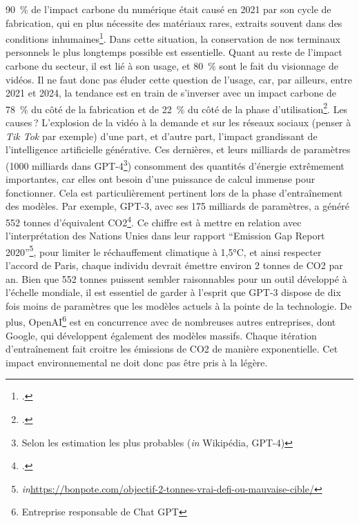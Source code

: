 90 \% de l’impact carbone du numérique était causé en 2021 par son cycle de fabrication, qui en plus nécessite des matériaux rares, extraits souvent dans des conditions inhumaines\footcite[§ 16]{guillard_chapitre_2021}. Dans cette situation, la conservation de nos terminaux personnels le plus longtemps possible est essentielle. Quant au reste de l’impact carbone du secteur, il est lié à son usage, et 80 \% sont le fait du visionnage de vidéos. Il ne faut donc pas éluder cette question de l’usage, car, par ailleurs, entre 2021 et 2024, la tendance est en train de s’inverser avec un impact carbone de 78 \% du côté de la fabrication et de 22 \% du côté de la phase d’utilisation\footcite{noauthor_quelle_nodate}. Les causes ? L’explosion de la vidéo à la demande et sur les réseaux sociaux (penser à \textit{Tik Tok} par exemple) d’une part, et d’autre part, l’impact grandissant de l’intelligence artificielle générative. Ces dernières, et leurs milliards de paramètres (1000 milliards dans GPT-4\footnote{Selon les estimation les plus probables (\textit{in} Wikipédia, GPT-4)}) consomment des quantités d’énergie extrêmement importantes, car elles ont besoin d’une puissance de calcul immense pour fonctionner. Cela est particulièrement pertinent lors de la phase d’entraînement des modèles. Par exemple, GPT-3, avec ses 175 milliards de paramètres, a généré 552 tonnes d’équivalent CO2\footcite{noauthor_pourquoi_2023}. Ce chiffre est à mettre en relation avec l'interprétation des Nations Unies dans leur rapport \enquote{Emission Gap Report 2020}\footnote{\textit{in}\url{https://bonpote.com/objectif-2-tonnes-vrai-defi-ou-mauvaise-cible/}}, pour limiter le réchauffement climatique à 1,5°C, et ainsi respecter l’accord de Paris, chaque individu devrait émettre environ 2 tonnes de CO2 par an. Bien que 552 tonnes puissent sembler raisonnables pour un outil développé à l’échelle mondiale, il est essentiel de garder à l’esprit que GPT-3 dispose de dix fois moins de paramètres que les modèles actuels à la pointe de la technologie. De plus, OpenAI\footnote{Entreprise responsable de Chat GPT} est en concurrence avec de nombreuses autres entreprises, dont Google, qui développent également des modèles massifs. Chaque itération d’entraînement fait croitre les émissions de CO2 de manière exponentielle. Cet impact environnemental ne doit donc pas être pris à la légère.

